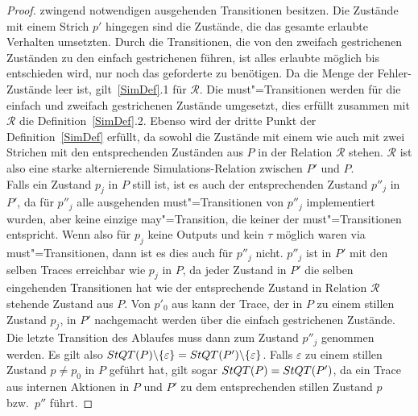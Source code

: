 \begin{proof}
  zwingend notwendigen ausgehenden Transitionen besitzen. Die Zustände mit
  einem Strich $p'$ hingegen sind die Zustände, die das gesamte erlaubte
  Verhalten umsetzten. Durch die Transitionen, die von den zweifach
  gestrichenen Zuständen zu den einfach gestrichenen führen, ist alles erlaubte
  möglich bis entschieden wird, nur noch das geforderte zu benötigen. Da die
  Menge der Fehler-Zustände leer ist, gilt~\ref{SimDef}.1 für $\mathcal{R}$.
  Die must"=Transitionen werden für die einfach und zweifach gestrichenen
  Zustände umgesetzt, dies erfüllt zusammen mit $\mathcal{R}$ die
  Definition~\ref{SimDef}.2. Ebenso wird der dritte Punkt der
  Definition~\ref{SimDef} erfüllt, da sowohl die Zustände mit einem wie auch
  mit zwei Strichen mit den entsprechenden Zuständen aus $P$ in der Relation
  $\mathcal{R}$ stehen. $\mathcal{R}$ ist also eine starke alternierende
  Simulations-Relation zwischen $P'$ und $P$.\\
  Falls ein Zustand $p_j$ in $P$ still ist, ist es auch der entsprechenden
  Zustand $p''_j$ in $P'$, da für $p''_j$ alle ausgehenden must"=Transitionen
  von $p''_j$ implementiert wurden, aber keine einzige may"=Transition, die
  keiner der must"=Transitionen entspricht. Wenn also für $p_j$ keine Outputs
  und kein $\tau$ möglich waren via must"=Transitionen, dann ist es dies auch
  für $p''_j$ nicht. $p''_j$ ist in $P'$ mit den selben Traces erreichbar wie
  $p_j$ in $P$, da jeder Zustand in $P'$ die selben eingehenden Transitionen
  hat wie der entsprechende Zustand in Relation $\mathcal{R}$ stehende Zustand
  aus $P$. Von $p'_0$ aus kann der Trace, der in $P$ zu einem stillen Zustand
  $p_j$, in $P'$ nachgemacht werden über die einfach gestrichenen Zustände. Die
  letzte Transition des Ablaufes muss dann zum Zustand $p''_j$ genommen werden.
  Es gilt also $StQT (P)\backslash \{\varepsilon\} = StQT (P')\backslash
  \{\varepsilon\}$. Falls $\varepsilon$ zu einem stillen Zustand $p \neq p_0$
  in $P$ geführt hat, gilt sogar $StQT(P) = StQT (P')$, da ein Trace aus
  internen Aktionen in $P$ und $P'$ zu dem entsprechenden stillen Zustand $p$
  bzw.\ $p''$ führt.


\end{proof}
